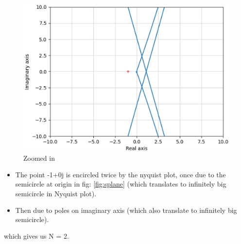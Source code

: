 \begin{enumerate}[label=\thesubsection.\arabic*.,ref=\thesubsection.\theenumi]
\begin{figure}[ht!]
    \includegraphics[width=\columnwidth]{./figs/ee18btech11025/g2.eps}
    \caption{Zoomed in}
    \label{fig:nyqplot1}
\end{figure}
\begin{itemize}
    \item The point -1+0j is encircled twice by the nyquist plot, once due to the semicircle at origin in fig: \ref{fig:splane} (which translates to infinitely big semicircle in Nyquist plot).
    \item Then due to poles on imaginary axis (which also translate to infinitely big semicircle).
\end{itemize}

which gives us N = 2.


\end{enumerate}
